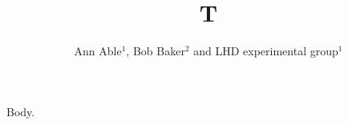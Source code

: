 \documentclass[aps,prd]{revtex4-1}
\begin{document}
\title{T}
\author{Ann Able$^{1}$, Bob Baker$^{2}$ and LHD experimental group$^{1}$}
\maketitle
Body.
\end{document}
